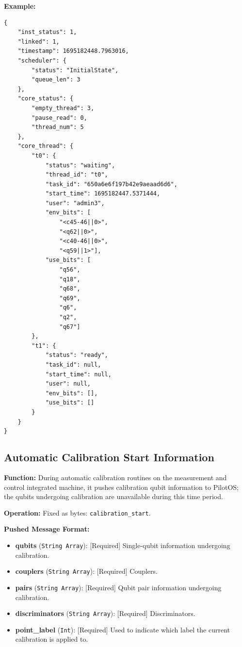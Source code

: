 \documentclass[12pt, a4paper]{article}
\begin{document}
\noindent \textbf{Example:}
\begin{lstlisting}
{
    "inst_status": 1,
    "linked": 1,
    "timestamp": 1695182448.7963016,
    "scheduler": {
        "status": "InitialState",
        "queue_len": 3
    },
    "core_status": {
        "empty_thread": 3,
        "pause_read": 0,
        "thread_num": 5
    },
    "core_thread": {
        "t0": {
            "status": "waiting",
            "thread_id": "t0",
            "task_id": "650a6e6f197b42e9aeaad6d6",
            "start_time": 1695182447.5371444,
            "user": "admin3",
            "env_bits": [
                "<c45-46||0>",
                "<q62||0>",
                "<c40-46||0>",
                "<q59||1>"],
            "use_bits": [
                "q56",
                "q18",
                "q68",
                "q69",
                "q6",
                "q2",
                "q67"]
        },
        "t1": {
            "status": "ready",
            "task_id": null,
            "start_time": null,
            "user": null,
            "env_bits": [],
            "use_bits": []
        }
    }
}
\end{lstlisting}

\subsection{Automatic Calibration Start Information}

\textbf{Function:} During automatic calibration routines on the measurement and control integrated machine, it pushes calibration qubit information to PilotOS; the qubits undergoing calibration are unavailable during this time period.

\textbf{Operation:} Fixed as bytes: \texttt{calibration\_start}.

\textbf{Pushed Message Format:}
\begin{itemize}
    \item \textbf{qubits} (\texttt{String Array}): [Required] Single-qubit information undergoing calibration.
    \item \textbf{couplers} (\texttt{String Array}): [Required] Couplers.
    \item \textbf{pairs} (\texttt{String Array}): [Required] Qubit pair information undergoing calibration.
    \item \textbf{discriminators} (\texttt{String Array}): [Required] Discriminators.
    \item \textbf{point\_label} (\texttt{Int}): [Required] Used to indicate which label the current calibration is applied to.
\end{itemize}
\end{document}
